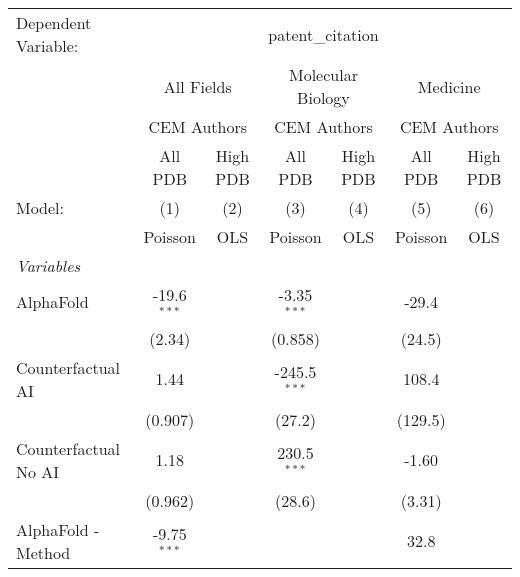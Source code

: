\begingroup
\centering
\begin{tabular}{lcccccc}
   \tabularnewline \midrule \midrule
   Dependent Variable: & \multicolumn{6}{c}{patent\_citation}\\
 & \multicolumn{2}{c}{All Fields} & \multicolumn{2}{c}{Molecular Biology} & \multicolumn{2}{c}{Medicine} \\
\cmidrule(lr){2-3} \cmidrule(lr){4-5} \cmidrule(lr){6-7}
 & \multicolumn{2}{c}{CEM Authors} & \multicolumn{2}{c}{CEM Authors} & \multicolumn{2}{c}{CEM Authors} \\
\cmidrule(lr){2-3} \cmidrule(lr){4-5} \cmidrule(lr){6-7}
 & \multicolumn{1}{c}{All PDB} & \multicolumn{1}{c}{High PDB} & \multicolumn{1}{c}{All PDB} & \multicolumn{1}{c}{High PDB} & \multicolumn{1}{c}{All PDB} & \multicolumn{1}{c}{High PDB} \\
\cmidrule(lr){2-2} \cmidrule(lr){3-3} \cmidrule(lr){4-4} \cmidrule(lr){5-5} \cmidrule(lr){6-6} \cmidrule(lr){7-7}
   Model:                                                     & (1)           & (2)  & (3)            & (4)  & (5)           & (6)\\  
                                                              &  Poisson      & OLS  & Poisson        & OLS  & Poisson       & OLS\\  
   \midrule
   \emph{Variables}\\
   AlphaFold                                                  & -19.6$^{***}$ &      & -3.35$^{***}$  &      & -29.4         &   \\   
                                                              & (2.34)        &      & (0.858)        &      & (24.5)        &   \\   
   Counterfactual AI                                          & 1.44          &      & -245.5$^{***}$ &      & 108.4         &   \\   
                                                              & (0.907)       &      & (27.2)         &      & (129.5)       &   \\   
   Counterfactual No AI                                       & 1.18          &      & 230.5$^{***}$  &      & -1.60         &   \\   
                                                              & (0.962)       &      & (28.6)         &      & (3.31)        &   \\   
   AlphaFold - Method                                         & -9.75$^{***}$ &      &                &      & 32.8          &   \\   

\end{tabular}
